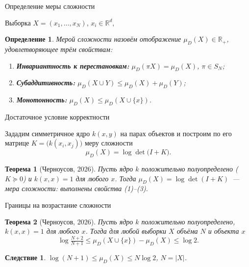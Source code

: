 \documentclass[aspectratio=43]{beamer}
\newtheorem{rustheorem}{Теорема}
\newtheorem{rusdefinition}{Определение}
\newtheorem{ruscorollary}{Следствие}
\begin{document}
\begin{frame}{Определение меры сложности}
\justifying

Выборка $X = (x_1, \dots, x_N)$, \;$x_i \in \mathbb{R}^d$,

\medskip
\begin{rusdefinition}
\emph{Мерой сложности} назовём отображение $\mu_D(X) \in \mathbb{R}_+$,
удовлетворяющее трём свойствам:
\begin{enumerate}
    \item \textbf{Инвариантность к перестановкам:}\;
          $\mu_D(\pi X) = \mu_D(X)$, \;$\pi \in S_N$;
    \item \textbf{Субаддитивность:}\;
          $\mu_D(X \cup Y) \le \mu_D(X) + \mu_D(Y)$;
    \item \textbf{Монотонность:}\;
          $\mu_D(X) \le \mu_D(X \cup \{x\})$.
\end{enumerate}
\end{rusdefinition}
\end{frame}

\begin{frame}{Достаточное условие корректности}
\justifying

Зададим симметричное ядро $k(x, y)$ на парах объектов и
построим по его матрице $K = \bigl(k(x_i, x_j)\bigr)$ меру сложности
\[
    \mu_D(X) = \log\det\bigl(I + K\bigr).
\]

\begin{rustheorem}[Черноусов, 2026]
Пусть ядро $k$ положительно полуопределено ($K \succeq 0$) и
$k(x,x) = 1$ для любого $x$. Тогда $\mu_D(X) = \log\det(I+K)$~--- мера
сложности: выполнены свойства (1)--(3).
\end{rustheorem}
\end{frame}

\begin{frame}{Границы на возрастание сложности}
\begin{rustheorem}[Черноусов, 2026]
Пусть ядро $k$ положительно полуопределено, $k(x,x)=1$ для любого $x$. Тогда для
любой выборки $X$ объёма $N$ и объекта $x$
\[
    \log\tfrac{N+2}{N+1} \le \mu_D(X\cup\{x\}) - \mu_D(X) \le \log 2.
\]
\end{rustheorem}
\begin{ruscorollary}
$\log(N{+}1) \le \mu_D(X) \le N\log 2$, \;$N = |X|$.
\end{ruscorollary}
\end{frame}
\end{document}
